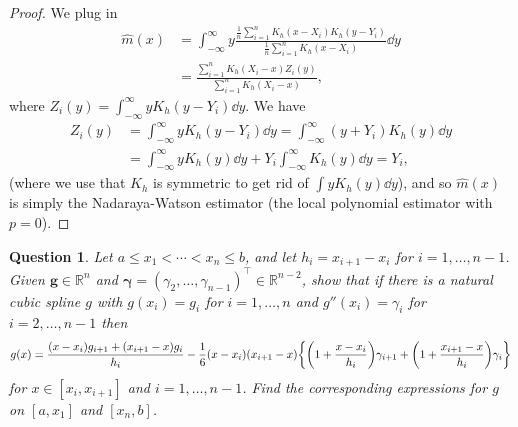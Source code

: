 \documentclass{article}
\theoremstyle{plain}
\newtheorem{question}{Question}
\theoremstyle{remark}
\renewcommand{\vec}{\boldsymbol}
\newcommand{\Bb}{\mathbb}
\newcommand{\RR}{\Bb R}
\newcommand{\T}{^\top} %
\begin{document}
\begin{proof}
	We plug in 
	\begin{align*}
	\hat m(x) &= \int_{-\infty}^\infty y \frac{\frac1n \sum_{i=1}^n K_h(x - X_i) K_h( y - Y_i)}{\frac1n \sum_{i=1}^n K_h(x - X_i)} \dd{y} \\
	&= \frac{ \sum_{i=1}^n K_h(X_i - x) Z_i(y)}{\sum_{i=1}^n K_h(X_i - x)},
	\end{align*}
where $Z_i(y) = \int_{-\infty}^\infty y K_h(y - Y_i) \dd{y}$. We have
\begin{align*}
Z_i(y) &= \int_{-\infty}^\infty y K_h(y - Y_i) \dd{y} = \int_{-\infty}^\infty (y + Y_i) K_h(y) \dd{y} \\
&= \int_{-\infty}^\infty y K_h(y) \dd{y} + Y_i \int_{-\infty}^\infty K_h(y)\dd{y} = Y_i, 
\end{align*}
(where we use that $K_h$ is symmetric to get rid of $\int y K_h(y) \dd{y}$),
and so $\hat m(x)$ is simply the Nadaraya-Watson estimator (the local polynomial estimator with $p = 0$). 
\end{proof}

\begin{question}
	Let $a \leq x_1 < \dotsb < x_n \leq b$, and let $h_i = x_{i+1} - x_i$ for $i = 1, \dotsc, n-1$. Given $\vec g \in \RR^n$ and $\vec \gamma = (\gamma_2, \dotsc, \gamma_{n-1})\T \in \RR^{n-2}$, show that if there is a natural cubic spline $g$ with $g(x_i) = g_i$ for $i =1 , \dotsc, n$ and $g''(x_i) = \gamma_i$ for $i = 2, \dotsc, n-1$ then
	\[
	g(x) = \frac{(x - x_i) g_{i+1} + (x_{i+1} - x)g_i}{h_i} - \frac16(x-x_i)(x_{i+1}-x)\qty{\qty(1 + \frac{x - x_i}{h_i}) \gamma_{i+1} + \qty(1 + \frac{x_{i+1} - x}{h_i})\gamma_i}
	\]
	for $x \in [x_i, x_{i+1}]$ and $i = 1, \dotsc, n-1$. Find the corresponding expressions for $g$ on $[a, x_1]$ and $[x_n, b]$. 
\end{question}
\end{document}

